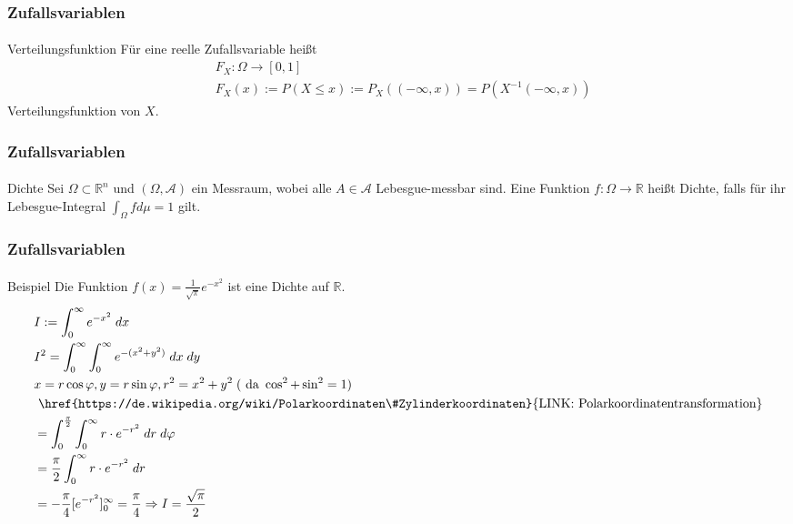 \documentclass{beamer}
\begin{document}
\begin{frame}
    \frametitle{Zufallsvariablen}
\framesubtitle{}

\begin{block}{Verteilungsfunktion}
Für eine reelle Zufallsvariable heißt 
\begin{align*} 
& F_X : \Omega \to [0,1] \\
& F_X (x) := P (X \leq x) := P_X (( -\infty, x )) = P(X^{-1} (-\infty, x))
\end{align*}
Verteilungsfunktion von $X$.
\end{block}
 \end{frame}

\begin{frame}
    \frametitle{Zufallsvariablen}
\framesubtitle{}

\begin{block}{Dichte}
Sei $\Omega \subset \mathbb{R}^n$ und $(\Omega, \mathcal{A})$ ein Messraum, wobei alle $A \in \mathcal{A}$ Lebesgue-messbar sind.
 Eine Funktion $f: \Omega \to \mathbb{R}$ heißt Dichte, falls für ihr Lebesgue-Integral $\int_{\Omega} f d \mu = 1$ gilt.
\end{block}
 \end{frame}

\begin{frame}
    \frametitle{Zufallsvariablen}
\framesubtitle{}
\begin{block}{Beispiel}
Die Funktion $f(x) = \frac{1}{\sqrt{\pi}} e^{- x^2}$ ist eine Dichte auf $ \mathbb{R}$.
\begin{align*}
& I := \int_{0}^{\infty} e^{-x^2} \; dx\\
& I^2 = \int_{0}^{\infty} \int_{0}^{\infty} e^{-(x^2+y^2)} \; dx \;dy \\
&x=r \cos \varphi ,y=r\sin \varphi ,r^2 = x^2 + y^2  \; (\text{ da } \cos^2 + \sin^2 = 1)\\
 &\text{ \href{https://de.wikipedia.org/wiki/Polarkoordinaten\#Zylinderkoordinaten}{LINK: Polarkoordinatentransformation}} \\
& = \int_{0}^{\frac{\pi}{2}}  \int_{0}^{\infty}r \cdot e^{-r^2} \; dr \;d\varphi \\
&= \frac{\pi}{2} \int_{0}^{\infty}r \cdot e^{-r^2} \; dr \\
&= -\frac{\pi}{4} [e^{-r^2} ]_0^{\infty} = \frac{\pi}{4} \Rightarrow I = \frac{\sqrt{\pi}}{2}
\end{align*}
\end{block}
 \end{frame}
\end{document}
